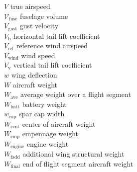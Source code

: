 \begin{tabbing}
$V$ \> true airspeed \\ %
$\mathcal{V}_{\text{fuse}}$ \>  fuselage volume \\ %
$V_{\text{gust}}$ \>  gust velocity \\ %
$V_{\text{h}}$ \> horizontal tail lift coefficient \\
$V_{\text{ref}}$ \>  reference wind airspeed \\ %
$V_{\text{wind}}$ \>  wind speed \\ %
$V_{\text{v}}$ \> vertical tail lift coefficient \\
$w$ \> wing deflection \\ %
$W$ \> aircraft weight \\ %
$W_{\text{ave}}$ \> average weight over a flight segment \\ %
$W_{\text{batt}}$ \> battery weight \\ %
$w_{\text{cap}}$ \> spar cap width \\ %
$W_{\text{cent}}$ \> center of aircraft weight \\ %
$W_{\text{emp}}$ \> empennage weight \\ %
$W_{\text{engine}}$ \> engine weight \\ %
$W_{\text{fadd}}$ \> additional wing structural weight\\ %
$W_{\text{final}}$ \> end of flight segment aircraft weight \\ %

\end{tabbing}
